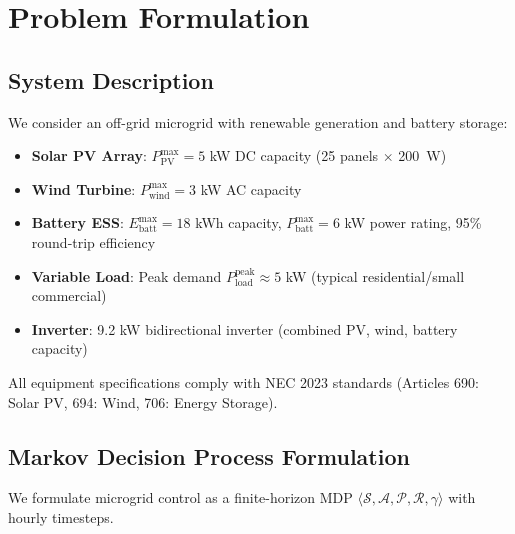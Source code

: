 \documentclass[11pt,a4paper]{article}
\begin{document}
\section{Problem Formulation}
\label{sec:problem}

\subsection{System Description}

We consider an off-grid microgrid with renewable generation and battery storage:
\begin{itemize}
    \item \textbf{Solar PV Array}: $P_{\text{PV}}^{\text{max}} = 5$ kW DC capacity (25 panels $\times$ 200~W)
    \item \textbf{Wind Turbine}: $P_{\text{wind}}^{\text{max}} = 3$ kW AC capacity  
    \item \textbf{Battery ESS}: $E_{\text{batt}}^{\text{max}} = 18$ kWh capacity, $P_{\text{batt}}^{\text{max}} = 6$ kW power rating, 95\% round-trip efficiency
    \item \textbf{Variable Load}: Peak demand $P_{\text{load}}^{\text{peak}} \approx 5$ kW (typical residential/small commercial)
    \item \textbf{Inverter}: 9.2 kW bidirectional inverter (combined PV, wind, battery capacity)
\end{itemize}

All equipment specifications comply with NEC 2023 standards (Articles 690: Solar PV, 694: Wind, 706: Energy Storage).

\subsection{Markov Decision Process Formulation}

We formulate microgrid control as a finite-horizon MDP $\langle \mathcal{S}, \mathcal{A}, \mathcal{P}, \mathcal{R}, \gamma \rangle$ with hourly timesteps.
\end{document}
